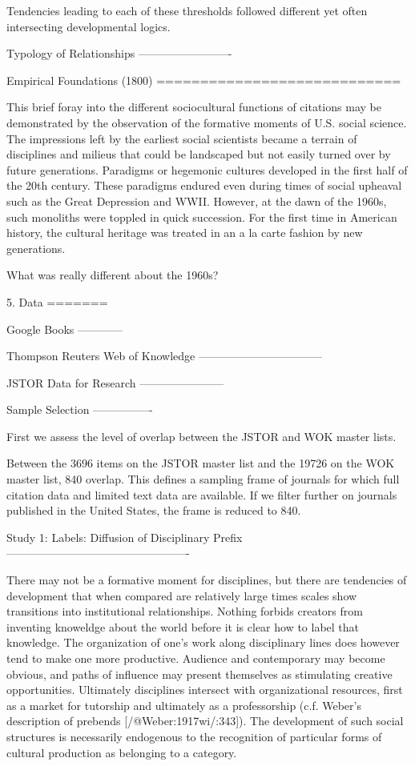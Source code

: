 Tendencies leading to each of these thresholds followed different yet
often intersecting developmental logics.

Typology of Relationships
-------------------------

Empirical Foundations (1800)
============================

This brief foray into the different sociocultural functions of citations
may be demonstrated by the observation of the formative moments of U.S.
social science. The impressions left by the earliest social scientists
became a terrain of disciplines and milieus that could be landscaped but
not easily turned over by future generations. Paradigms or hegemonic
cultures developed in the first half of the 20th century. These
paradigms endured even during times of social upheaval such as the Great
Depression and WWII. However, at the dawn of the 1960s, such monoliths
were toppled in quick succession. For the first time in American
history, the cultural heritage was treated in an a la carte fashion by
new generations.

What was really different about the 1960s?

5. Data
=======

Google Books
------------

Thompson Reuters Web of Knowledge
---------------------------------

JSTOR Data for Research
-----------------------

Sample Selection
----------------

First we assess the level of overlap between the JSTOR and WOK master
lists.

Between the 3696 items on the JSTOR master list and the 19726 on the WOK
master list, 840 overlap. This defines a sampling frame of journals for
which full citation data and limited text data are available. If we
filter further on journals published in the United States, the frame is
reduced to 840.

Study 1: Labels: Diffusion of Disciplinary Prefix
-------------------------------------------------

There may not be a formative moment for disciplines, but there are
tendencies of development that when compared are relatively large times
scales show transitions into institutional relationships. Nothing
forbids creators from inventing knoweldge about the world before it is
clear how to label that knowledge. The organization of one's work along
disciplinary lines does however tend to make one more productive.
Audience and contemporary may become obvious, and paths of influence may
present themselves as stimulating creative opportunities. Ultimately
disciplines intersect with organizational resources, first as a market
for tutorship and ultimately as a professorship (c.f. Weber's
description of prebends [/@Weber:1917wi/:343]). The development of such
social structures is necessarily endogenous to the recognition of
particular forms of cultural production as belonging to a category.

